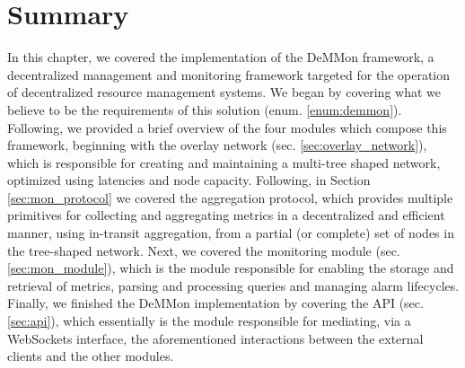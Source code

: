 \section{Summary}

In this chapter, we covered the implementation of the DeMMon framework, a decentralized management and monitoring framework targeted for the operation of decentralized resource management systems. We began by covering what we believe to be the requirements of this solution (enum. \ref{enum:demmon}). Following, we provided a brief overview of the four modules which compose this framework, beginning with the overlay network (sec. \ref{sec:overlay_network}), which is responsible for creating and maintaining a multi-tree shaped network, optimized using latencies and node capacity. Following, in Section \ref{sec:mon_protocol} we covered the aggregation protocol, which provides multiple primitives for collecting and aggregating metrics in a decentralized and efficient manner, using in-transit aggregation, from a partial (or complete) set of nodes in the tree-shaped network. Next, we covered the monitoring module (sec. \ref{sec:mon_module}), which is the module responsible for enabling the storage and retrieval of metrics, parsing and processing queries and managing alarm lifecycles. Finally, we finished the DeMMon implementation by covering the API (sec. \ref{sec:api}), which essentially is the module responsible for mediating, via a WebSockets interface, the aforementioned interactions between the external clients and the other modules.